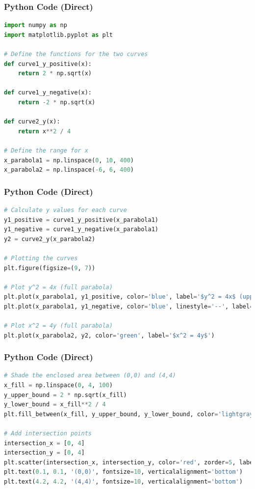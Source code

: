 \documentclass{beamer}
\begin{document}
\begin{frame}[fragile]
\frametitle{Python Code (Direct)}
\begin{lstlisting}[language=Python]
import numpy as np
import matplotlib.pyplot as plt

# Define the functions for the two curves
def curve1_y_positive(x):
    return 2 * np.sqrt(x)  

def curve1_y_negative(x):
    return -2 * np.sqrt(x) 

def curve2_y(x):
    return x**2 / 4  

# Define the range for x
x_parabola1 = np.linspace(0, 10, 400) 
x_parabola2 = np.linspace(-6, 6, 400) 
\end{lstlisting}
\end{frame}

\begin{frame}[fragile]
\frametitle{Python Code (Direct)}
\begin{lstlisting}[language=Python]
# Calculate y values for each curve
y1_positive = curve1_y_positive(x_parabola1)
y1_negative = curve1_y_negative(x_parabola1)
y2 = curve2_y(x_parabola2)

# Plotting the curves
plt.figure(figsize=(9, 7))

# Plot y^2 = 4x (full parabola)
plt.plot(x_parabola1, y1_positive, color='blue', label='$y^2 = 4x$ (upper part)')
plt.plot(x_parabola1, y1_negative, color='blue', linestyle='--', label='$y^2 = 4x$ (lower part)')

# Plot x^2 = 4y (full parabola)
plt.plot(x_parabola2, y2, color='green', label='$x^2 = 4y$')
\end{lstlisting}
\end{frame}

\begin{frame}[fragile]
\frametitle{Python Code (Direct)}
\begin{lstlisting}[language=Python]
# Shade the enclosed area between (0,0) and (4,4)
x_fill = np.linspace(0, 4, 100)
y_upper_bound = 2 * np.sqrt(x_fill)
y_lower_bound = x_fill**2 / 4
plt.fill_between(x_fill, y_upper_bound, y_lower_bound, color='lightgray', alpha=0.5, label='Enclosed Area')

# Add intersection points
intersection_x = [0, 4]
intersection_y = [0, 4]
plt.scatter(intersection_x, intersection_y, color='red', zorder=5, label='Intersection Points')
plt.text(0.1, 0.1, '(0,0)', fontsize=10, verticalalignment='bottom')
plt.text(4.2, 4.2, '(4,4)', fontsize=10, verticalalignment='bottom')
\end{lstlisting}
\end{frame}
\end{document}
